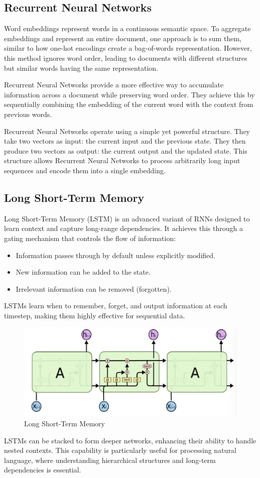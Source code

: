 \subsection{Recurrent Neural Networks}
Word embeddings represent words in a continuous semantic space. 
To aggregate embeddings and represent an entire document, one approach is to sum them, similar to how one-hot encodings create a bag-of-words representation. 
However, this method ignores word order, leading to documents with different structures but similar words having the same representation.

Recurrent Neural Networks provide a more effective way to accumulate information across a document while preserving word order. 
They achieve this by sequentially combining the embedding of the current word with the context from previous words.

Recurrent Neural Networks operate using a simple yet powerful structure. 
They take two vectors as input: the current input and the previous state. 
They then produce two vectors as output: the current output and the updated state. 
This structure allows Recurrent Neural Networks to process arbitrarily long input sequences and encode them into a single embedding.

\subsection{Long Short-Term Memory}
Long Short-Term Memory (LSTM) is an advanced variant of RNNs designed to learn context and capture long-range dependencies. 
It achieves this through a gating mechanism that controls the flow of information:
\begin{itemize}
    \item Information passes through by default unless explicitly modified.
    \item New information can be added to the state.
    \item Irrelevant information can be removed (forgotten).
\end{itemize}
\noindent LSTMs learn when to remember, forget, and output information at each timestep, making them highly effective for sequential data.
\begin{figure}[H]
    \centering
    \includegraphics[width=0.5\linewidth]{images/nlp1.png}
    \caption{Long Short-Term Memory}
\end{figure}
LSTMs can be stacked to form deeper networks, enhancing their ability to handle nested contexts. 
This capability is particularly useful for processing natural language, where understanding hierarchical structures and long-term dependencies is essential.


